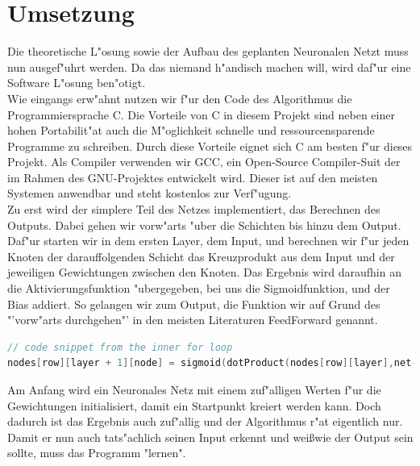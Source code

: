 \documentclass[12pt,a4paper]{scrartcl}
\begin{document}
\pagebreak

\section{Umsetzung}

Die theoretische L"osung sowie der Aufbau des geplanten Neuronalen Netzt muss nun ausgef"uhrt werden. Da das niemand h"andisch machen will, wird daf"ur eine Software L"osung ben"otigt.\\

Wie eingangs erw"ahnt nutzen wir f"ur den Code des Algorithmus die Programmiersprache C. Die Vorteile von C in diesem Projekt sind neben einer hohen Portabilit"at auch die M"oglichkeit schnelle und ressourcensparende Programme zu schreiben. Durch diese Vorteile eignet sich C am besten f"ur dieses Projekt. Als Compiler verwenden wir GCC, ein Open-Source Compiler-Suit der im Rahmen des GNU-Projektes entwickelt wird. Dieser ist auf den meisten Systemen anwendbar und steht kostenlos zur Verf"ugung.\\

Zu erst wird der simplere Teil des Netzes implementiert, das Berechnen des Outputs. Dabei gehen wir vorw"arts "uber die Schichten bis hinzu dem Output. Daf"ur starten wir in dem ersten Layer, dem Input, und berechnen wir f"ur jeden Knoten der darauffolgenden Schicht das Kreuzprodukt aus dem Input und der jeweiligen Gewichtungen zwischen den Knoten. Das Ergebnis wird daraufhin an die Aktivierungsfunktion "ubergegeben, bei uns die Sigmoidfunktion, und der Bias addiert. So gelangen wir zum Output, die Funktion wir auf Grund des "'vorw"arts durchgehen"' in den meisten Literaturen FeedForward genannt.\\

\begin{lstlisting}[language=C]
// code snippet from the inner for loop
nodes[row][layer + 1][node] = sigmoid(dotProduct(nodes[row][layer],net->weights[layer][node], net->n_nodes[layer]) + net->biases[layer][node]);
\end{lstlisting}

\pagebreak

Am Anfang wird ein Neuronales Netz mit einem zuf"alligen Werten f"ur die Gewichtungen initialisiert, damit ein Startpunkt kreiert werden kann. Doch dadurch ist das Ergebnis auch zuf"allig und der Algorithmus r"at eigentlich nur. Damit er nun auch tats"achlich seinen Input erkennt und wei\ss wie der Output sein sollte, muss das Programm "lernen".\\
\end{document}
